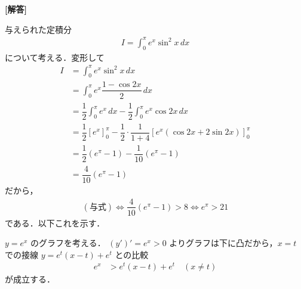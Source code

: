 \documentclass[../../main.tex]{subfiles}
\begin{document}
\begin{oframed}
  
\end{oframed}

{\bf [解答]}

与えられた定積分
\begin{align}
  I = \int_0^\pi e^x \sin^2 x \, dx \label{eq:1}
\end{align}
について考える．変形して
\begin{align}
  I
  &= \int_0^\pi e^x \sin^2 x \, dx \\
  &= \int_0^\pi e^x \dfrac{1 - \cos 2x}{2} \, dx \\
  &= \dfrac{1}{2}\int_0^\pi e^x\, dx - \dfrac{1}{2}\int_0^\pi e^x\cos 2x\, dx \\
  &= \dfrac{1}{2} [ e^x ]_0^\pi - \dfrac{1}{2} \cdot \dfrac{1}{1+4} [ e^x (\cos 2x + 2\sin 2x) ]_0^\pi \\
  &= \dfrac{1}{2} (e^\pi - 1) - \dfrac{1}{10} (e^\pi - 1) \\
  &= \dfrac{4}{10} (e^\pi - 1)
\end{align}
だから，
\begin{align}
  (\text{与式})
  \iff \dfrac{4}{10} (e^\pi - 1) > 8
  \iff e^\pi > 21 \label{eq:2}
\end{align}
である．以下これを示す．

$y = e^x$ のグラフを考える．
$(y')' = e^x > 0$ よりグラフは下に凸だから，$x = t$ での接線 $y = e^t(x - t) + e^t$ との比較
\begin{align}
  e^x &> e^t(x - t) + e^t \quad (x \neq t)
\end{align}
が成立する．
\end{document}
